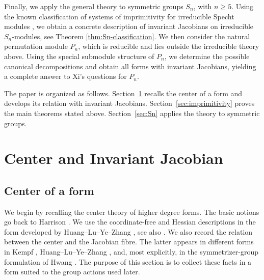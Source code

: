 \documentclass[11pt,reqno]{amsart}
\numberwithin{equation}{section}
\theoremstyle{definition}
\theoremstyle{remark}
\begin{document}
Finally, we apply the general theory to symmetric groups $S_n$, with $n\geq 5$. Using the known classification of systems of imprimitivity for irreducible
Specht modules \cite{DjokovicMalzan}, we obtain a
concrete description of invariant Jacobians on irreducible
$S_n$-modules, see Theorem \ref{thm:Sn-classification}. We then consider the natural permutation module $P_n$, which is reducible and lies outside the irreducible theory
above.   Using the special submodule structure of $P_n$, we  determine the possible canonical decompositions and
obtain all forms with invariant Jacobians, yielding a complete answer to Xi's questions for $P_n$.


The paper is organized as follows.
Section~\ref{sec:center} recalls the center of a form and develops
its relation with invariant Jacobians.
Section~\ref{sec:imprimitivity} proves the main theorems stated  above.
Section~\ref{sec:Sn} applies the theory to symmetric groups.

\section{Center and Invariant Jacobian}\label{sec:center}

\subsection{Center of a form}

We begin by recalling the center theory of higher degree forms.
The basic notions go back to Harrison \cite{Harrison}. We use the
coordinate-free and Hessian descriptions in the form developed by Huang--Lu--Ye--Zhang \cite{HLYZ},  see also
\cite{Proszynski,ORyanShapiro}.  We also record the relation between the center and the Jacobian fibre. The latter appears in different forms in Kempf \cite{Kempf},
Huang--Lu--Ye--Zhang \cite{HLYZ}, and, most explicitly, in the
symmetrizer-group formulation of Hwang \cite{Hwang}.  The purpose of
this section is to collect these facts in a form suited to the group
actions used later.
\end{document}
